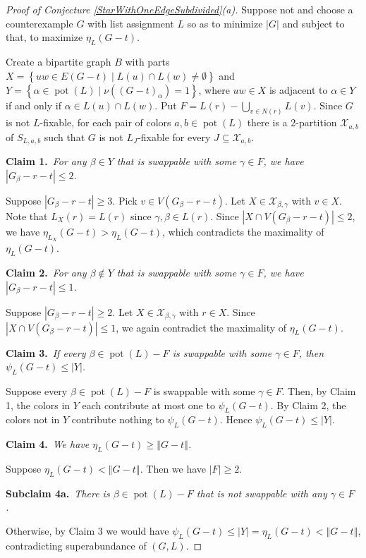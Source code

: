 \documentclass[12pt]{article}
\theoremstyle{plain}
\theoremstyle{definition}
\theoremstyle{remark}
\newcommand{\fancy}[1]{\mathcal{#1}}
\newcommand{\setb}[3]{\left\{ #1 \in #2 \mid #3 \right\}}
\newcommand{\card}[1]{\left|#1\right|}
\newcommand{\size}[1]{\left\Vert#1\right\Vert}
\newcommand{\pot}{\operatorname{pot}}
\def\X{\fancy{X}}
\newcommand{\claim}[2]{{\bf Claim #1.}~{\it #2}~~}
\newcommand{\subclaim}[2]{{\bf Subclaim #1.}~{\it #2}~~}
\begin{document}
\begin{proof} [Proof of Conjecture \ref{StarWithOneEdgeSubdivided}(a)]
	Suppose not and choose a counterexample $G$ with list assignment $L$ so as to minimize $\card{G}$ and subject to that, to maximize $\eta_L(G-t)$.
	
	Create a bipartite graph $B$ with parts $X = \setb{uw}{E(G - t)}{L(u) \cap L(w) \ne \emptyset}$ and $Y = \setb{\alpha}{\pot(L)}{\nu((G - t)_\alpha) = 1}$, where $uw \in X$ is adjacent to $\alpha \in Y$ if and only if $\alpha \in L(u) \cap L(w)$.  Put $F = L(r) - \bigcup_{v \in N(r)} L(v)$.  Since $G$ is not $L$-fixable, for each pair of colors $a,b \in \pot(L)$ there is a 2-partition $\X_{a,b}$ of $S_{L,a,b}$ such that $G$ is not $L_J$-fixable for every $J \subseteq \X_{a,b}$.
	
	\claim{1}{For any $\beta \in Y$ that is swappable with some $\gamma \in F$, we have $\card{G_\beta - r - t} \le 2$.}
	
	Suppose $\card{G_\beta - r - t} \ge 3$.  Pick $v \in V(G_\beta - r - t)$.  Let $X \in \X_{\beta,\gamma}$ with $v \in X$.  Note that $L_X(r) = L(r)$ since $\gamma, \beta \in L(r)$.  Since $\card{X \cap V(G_\beta - r - t)} \le 2$,  we have $\eta_{L_X}(G - t) > \eta_L(G - t)$, which contradicts the maximality of $\eta_L(G - t)$.
	
	\claim{2}{For any $\beta \not \in Y$ that is swappable with some $\gamma \in F$, we have $\card{G_\beta - r - t} \le 1$.}
	
	Suppose $\card{G_\beta - r - t} \ge 2$.  Let $X \in \X_{\beta,\gamma}$ with $r \in X$.  Since $\card{X \cap V(G_\beta - r - t)} \le 1$, we again contradict the maximality of $\eta_L(G - t)$.

	\claim{3}{If every $\beta \in \pot(L) - F$ is swappable with some $\gamma \in F$, then $\psi_L(G - t) \le |Y|$.}
	
	Suppose every $\beta \in \pot(L) - F$ is swappable with some $\gamma \in F$.  Then, by Claim 1, the colors in $Y$ each contribute at most one to $\psi_L(G - t)$.  By Claim 2, the colors not in $Y$ contribute nothing to $\psi_L(G - t)$.  Hence $\psi_L(G - t) \le \card{Y}$.

	\claim{4}{We have $\eta_L(G - t) \ge \size{G - t}$.}
	
	Suppose $\eta_L(G - t) < \size{G - t}$. Then we have $\card{F} \ge 2$. 
	
	\subclaim{4a}{There is $\beta \in \pot(L) - F$ that is not swappable with any $\gamma \in F$.}
		
	Otherwise, by Claim 3 we would have $\psi_L(G - t) \le |Y| = \eta_L(G - t) < \size{G - t}$, contradicting superabundance of $(G,L)$.
	

\end{proof}
\end{document}
